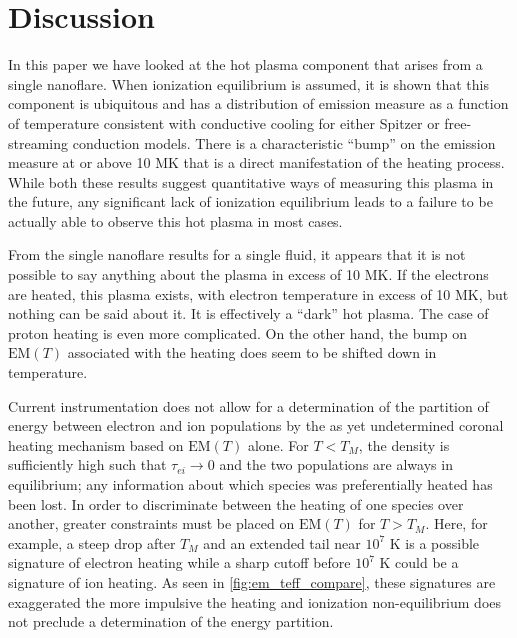 \documentclass[apj]{emulateapj}
\begin{document}
	\section{Discussion}
	\label{sec:discussion}
	\par In this paper we have looked at the hot plasma component that arises from a single nanoflare. When ionization equilibrium is assumed, it is shown that this component is ubiquitous and has a distribution of emission measure as a function of temperature consistent with conductive cooling for either Spitzer or free-streaming conduction models. There is a characteristic ``bump'' on the emission measure at or above 10 MK that is a direct manifestation of the heating process. While both these results suggest quantitative ways of measuring this plasma in the future, any significant lack of ionization equilibrium leads to a failure to be actually able to observe this hot plasma in most cases.
	\par From the single nanoflare results for a single fluid, it appears that it is not possible to say anything about the plasma in excess of 10 MK. If the electrons are heated, this plasma exists, with electron temperature in excess of 10 MK, but nothing can be said about it. It is effectively a ``dark'' hot plasma. The case of proton heating is even more complicated. On the other hand, the bump on $\mathrm{EM}(T)$ associated with the heating does seem to be shifted down in temperature.
	\par Current instrumentation does not allow for a determination of the partition of energy between electron and ion populations by the as yet undetermined coronal heating mechanism based on $\mathrm{EM}(T)$ alone. For $T<T_M$, the density is sufficiently high such that $\tau_{ei}\to0$ and the two populations are always in equilibrium; any information about which species was preferentially heated has been lost. In order to discriminate between the heating of one species over another, greater constraints must be placed on $\mathrm{EM}(T)$ for $T>T_M$. Here, for example, a steep drop after $T_M$ and an extended tail near $10^7$ K is a possible signature of electron heating while a sharp cutoff before $10^7$ K could be a signature of ion heating. As seen in \autoref{fig:em_teff_compare}, these signatures are exaggerated the more impulsive the heating and ionization non-equilibrium does not preclude a determination of the energy partition.
\end{document}
